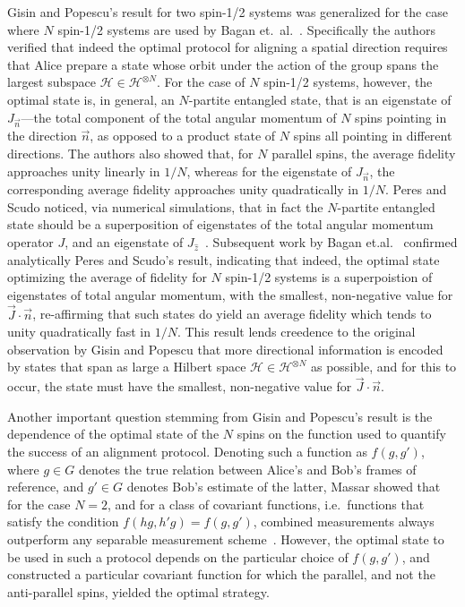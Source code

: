 \documentclass{article}
\newcommand\cH{{\mathscr{H}}}
\begin{document}
Gisin and Popescu's result for two spin-1/2 systems was generalized for the case where $N$ spin-1/2 systems are used by Bagan et.~al.~\cite{BBBM00}.  Specifically the authors verified that indeed the optimal protocol for aligning a spatial direction requires that Alice prepare a state whose orbit under the action of the group spans the largest subspace $\cH\in\cH^{\otimes N}$.  For the case of $N$ spin-1/2 systems, however, the optimal state is, in general, an $N$-partite entangled state, that is an eigenstate of $J_{\vec{n}}$---the total component of the total angular momentum of $N$ spins pointing in the direction $\vec{n}$, as opposed to a product state of $N$ spins all pointing in different directions.  The authors also showed that, for $N$ parallel spins, the average fidelity approaches unity linearly in $1/N$, whereas for the eigenstate of $J_{\vec{n}}$, the corresponding average fidelity approaches unity quadratically in $1/N$. Peres and Scudo noticed, via numerical simulations, that in fact the $N$-partite entangled state should be a superposition of eigenstates of the total angular momentum operator $J$, and an eigenstate of $J_{\hat{z}}$~\cite{PS01a}.  Subsequent work by Bagan et.al.~\cite{BBBMT01} confirmed analytically Peres and Scudo's result, indicating that indeed, the optimal state optimizing the average of fidelity for $N$ spin-1/2 systems is a superpoistion of eigenstates of total angular momentum, with the smallest, non-negative value for $\vec{J}\cdot\vec{n}$, re-affirming that such states do yield an average fidelity which tends to unity quadratically fast in $1/N$.  This result lends creedence to the original observation by Gisin and Popescu that more directional information is encoded by states that span as large a Hilbert space $\cH\in\cH^{\otimes N}$ as possible, and for this to occur, the state must have the smallest, non-negative value for $\vec{J}\cdot\vec{n}$.   

Another important question stemming from Gisin and Popescu's result is the dependence of the optimal state of the $N$ spins on the function used to quantify the success of an alignment protocol.  Denoting such a function as $f(g,g')$, where $g\in G$ denotes the true relation between Alice's and Bob's frames of reference, and $g'\in G$ denotes Bob's estimate of the latter, Massar showed that for the case $N=2$, and for a class of covariant functions, i.e.~functions that satisfy the condition $f(hg,h'g)=f(g,g')$, combined measurements always outperform any separable measurement scheme~\cite{M00}.  However, the optimal state to be used in such a protocol depends on the particular choice of $f(g,g')$, and constructed a particular covariant function for which the parallel, and not the anti-parallel spins, yielded the optimal strategy.
\end{document}
